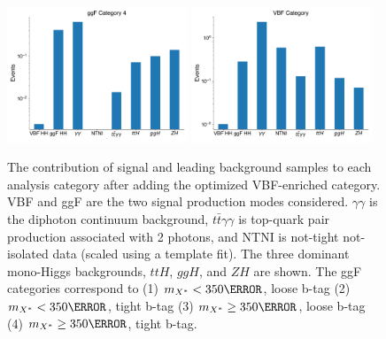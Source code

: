 \begin{figure}[p!]
  \includegraphics[width=0.48\textwidth]{chapters/chapter6_vbf/images/category_breakdown/ggfcat4.pdf}
  \includegraphics[width=0.48\textwidth]{chapters/chapter6_vbf/images/category_breakdown/vbfcat.pdf}
  \caption[The contribution of signal and leading background samples to each analysis category after adding the optimized VBF-enriched category]{The contribution of signal and leading background samples to each analysis category after adding the optimized VBF-enriched category. VBF and ggF \HH are the two signal production modes considered. $\gamma \gamma$ is the diphoton continuum background, $t\bar{t}\gamma\gamma$ is top-quark pair production associated with 2 photons, and NTNI is not-tight not-isolated data (scaled using a template fit). The three dominant mono-Higgs backgrounds, $ttH$, $ggH$, and $ZH$ are shown. The \gls{ggF} categories correspond to (1) $m_{X^{*}} < \unit{350}{\GeV}$, loose b-tag (2) $m_{X^{*}} < \unit{350}{\GeV}$, tight b-tag (3) $m_{X^{*}} \geq \unit{350}{\GeV}$, loose b-tag (4) $m_{X^{*}} \geq \unit{350}{\GeV}$, tight b-tag.}
  \label{fig:category-yields}
\end{figure}


